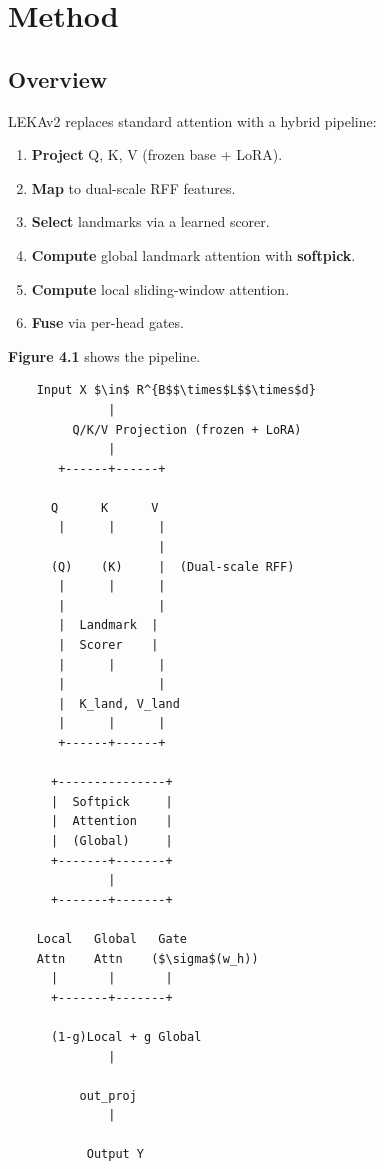 \section{Method}

\subsection{Overview}

LEKAv2 replaces standard attention with a hybrid pipeline:

\begin{enumerate}
\item \textbf{Project} Q, K, V (frozen base + LoRA).
\item \textbf{Map} to dual-scale RFF features.
\item \textbf{Select} landmarks via a learned scorer.
\item \textbf{Compute} global landmark attention with \textbf{softpick}.
\item \textbf{Compute} local sliding-window attention.
\item \textbf{Fuse} via per-head gates.

\end{enumerate}
\textbf{Figure 4.1} shows the pipeline.

\begin{lstlisting}
    Input X $\in$ R^{B$$\times$L$$\times$d}
              |
         Q/K/V Projection (frozen + LoRA)
              |
       +------+------+
                      
      Q      K      V
       |      |      |
                     |
      (Q)    (K)     |  (Dual-scale RFF)
       |      |      |
       |             |
       |  Landmark  |
       |  Scorer    |
       |      |      |
       |             |
       |  K_land, V_land
       |      |      |
       +------+------+
               
      +---------------+
      |  Softpick     |
      |  Attention    |
      |  (Global)     |
      +-------+-------+
              |
      +-------+-------+
                       
    Local   Global   Gate
    Attn    Attn    ($\sigma$(w_h))
      |       |       |
      +-------+-------+
               
      (1-g)Local + g Global
              |
               
          out_proj
              |
               
           Output Y
\end{lstlisting}


